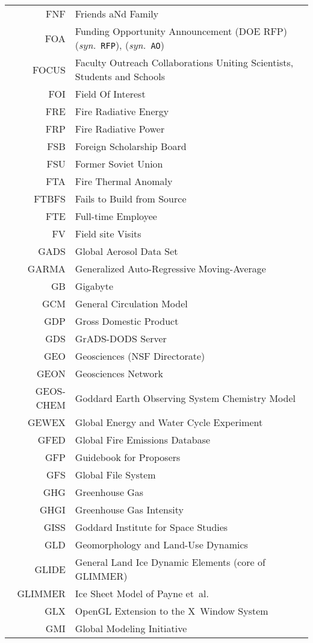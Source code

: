 \documentclass[12pt,twoside]{article}
\newcommand{\syn}[1]{(\textit{syn.}~\texttt{#1})}
\begin{document}
\begin{longtable}[>{\bfseries}l]{>{\ttfamily}r l}
FNF & Friends aNd Family \\
FOA & Funding Opportunity Announcement (DOE RFP) \syn{RFP}, \syn{AO} \\
FOCUS & Faculty Outreach Collaborations Uniting Scientists, Students and Schools \\
FOI & Field Of Interest \\
FRE & Fire Radiative Energy \\
FRP & Fire Radiative Power \\
FSB & Foreign Scholarship Board \\
FSU & Former Soviet Union \\
FTA & Fire Thermal Anomaly \\
FTBFS & Fails to Build from Source \\
FTE & Full-time Employee \\
FV & Field site Visits \\
GADS & Global Aerosol Data Set \\
GARMA & Generalized Auto-Regressive Moving-Average \\
GB & Gigabyte \\
GCM & General Circulation Model \\
GDP & Gross Domestic Product \\
GDS & GrADS-DODS Server \\
GEO & Geosciences (NSF Directorate) \\
GEON & Geosciences Network \\
GEOS-CHEM & Goddard Earth Observing System Chemistry Model \\
GEWEX & Global Energy and Water Cycle Experiment \\
GFED & Global Fire Emissions Database \\
GFP & Guidebook for Proposers \\
GFS & Global File System \\
GHG & Greenhouse Gas \\
GHGI & Greenhouse Gas Intensity \\
GISS & Goddard Institute for Space Studies \\
GLD & Geomorphology and Land-Use Dynamics \\
GLIDE & General Land Ice Dynamic Elements (core of GLIMMER) \\
GLIMMER & Ice Sheet Model of Payne et~al. \\
GLX & OpenGL Extension to the X~Window System \\
GMI & Global Modeling Initiative \\

\end{longtable}
\end{document}
